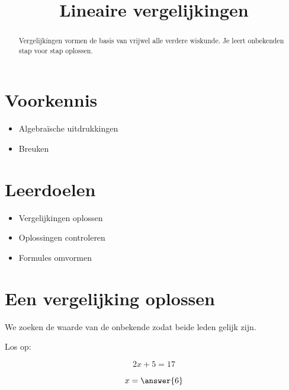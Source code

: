 \documentclass{ximera}
\title{Lineaire vergelijkingen}
\begin{document}
\begin{abstract}
Vergelijkingen vormen de basis van vrijwel alle verdere wiskunde. Je leert onbekenden stap voor stap oplossen.
\end{abstract}

\maketitle

\section{Voorkennis}
\begin{itemize}
\item Algebraïsche uitdrukkingen
\item Breuken
\end{itemize}


\section{Leerdoelen}
\begin{itemize}
\item Vergelijkingen oplossen
\item Oplossingen controleren
\item Formules omvormen
\end{itemize}


\section{Een vergelijking oplossen}

We zoeken de waarde van de onbekende zodat beide leden gelijk zijn.

\begin{exercise}

Los op:

\[
2x+5=17
\]

\[
x=\answer{6}
\]

\end{exercise}
\end{document}
